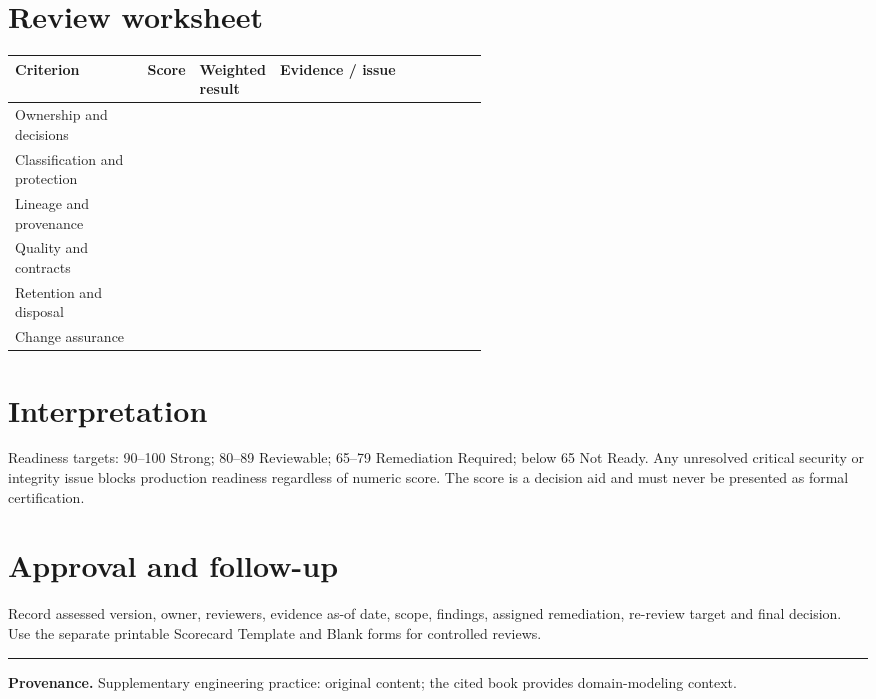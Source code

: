 \documentclass[11pt,letterpaper]{article}
\begin{document}
\section{Review worksheet}
\begin{tabularx}{\linewidth}{@{}>{\raggedright\arraybackslash}p{0.28\linewidth} >{\raggedright\arraybackslash}p{0.1\linewidth} >{\raggedright\arraybackslash}p{0.17\linewidth}>{\raggedright\arraybackslash}X@{}}
\toprule
\textbf{Criterion} & \textbf{Score} & \textbf{Weighted result} & \textbf{Evidence / issue} \\ 
\midrule
Ownership and decisions &  &  &  \\ 
Classification and protection &  &  &  \\ 
Lineage and provenance &  &  &  \\ 
Quality and contracts &  &  &  \\ 
Retention and disposal &  &  &  \\ 
Change assurance &  &  &  \\ 
\bottomrule
\end{tabularx}

\section{Interpretation}
Readiness targets: 90--100 Strong; 80--89 Reviewable; 65--79 Remediation Required; below 65 Not Ready. Any unresolved critical security or integrity issue blocks production readiness regardless of numeric score. The score is a decision aid and must never be presented as formal certification.


\section{Approval and follow-up}
Record assessed version, owner, reviewers, evidence as-of date, scope, findings, assigned remediation, re-review target and final decision. Use the separate printable Scorecard Template and Blank forms for controlled reviews.


\vfill
\hrule
{\footnotesize\textbf{Provenance.} Supplementary engineering practice: original content; the cited book provides domain-modeling context.}
\end{document}
